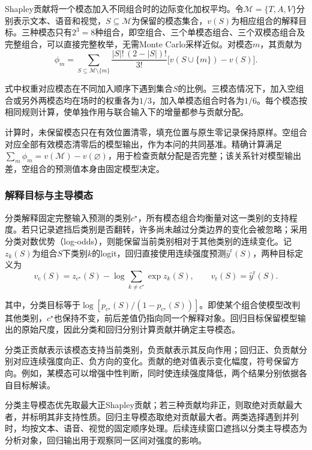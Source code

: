 \documentclass[UTF8,a4paper,12pt]{ctexart}
\newcommand{\QThreeParagraph}{\par\noindent\hspace*{2em}}
\begin{document}
Shapley贡献将一个模态加入不同组合时的边际变化加权平均。令$\mathcal M=\{T,A,V\}$分别表示文本、语音和视觉，$S\subseteq\mathcal M$为保留的模态集合，$v(S)$为相应组合的解释目标。三种模态只有$2^3=8$种组合，即空组合、三个单模态组合、三个双模态组合及完整组合，可以直接完整枚举，无需Monte Carlo采样近似。对模态$m$，其贡献为
\begin{equation}
\phi_m
=\sum_{S\subseteq\mathcal M\setminus\{m\}}
\frac{|S|!\,(2-|S|)!}{3!}
\bigl[v(S\cup\{m\})-v(S)\bigr].
\label{eq:q3_shapley}
\end{equation}
\QThreeParagraph 式中权重对应模态在不同加入顺序下遇到集合$S$的比例。三模态情况下，加入空组合或另外两模态均在场时的权重各为$1/3$，加入单模态组合时各为$1/6$。每个模态按相同规则计算，使单独作用与联合输入下的增量都参与贡献分配。

\QThreeParagraph 计算时，未保留模态只在有效位置清零，填充位置与原生零记录保持原样。空组合对应全部有效模态清零后的模型输出，作为本问的共同基准。精确计算满足$\sum_m\phi_m=v(\mathcal M)-v(\varnothing)$，用于检查贡献分配是否完整；该关系针对模型输出差，空组合的预测值本身由固定模型决定。

\subsubsection{解释目标与主导模态}
\QThreeParagraph 分类解释固定完整输入预测的类别$c^\star$，所有模态组合均衡量对这一类别的支持程度。若只记录遮挡后类别是否翻转，许多尚未越过分类边界的变化会被忽略；采用分类对数优势（log-odds），则能保留当前类别相对于其他类别的连续变化。记$z_k(S)$为组合$S$下类别$k$的logit，回归直接使用连续强度预测$\widehat y^{\mathrm r}(S)$，两种目标定义为
\begin{equation}
v_{\mathrm c}(S)
=z_{c^\star}(S)-\log\!\sum_{k\ne c^\star}\exp z_k(S),
\qquad
v_{\mathrm r}(S)=\widehat y^{\mathrm r}(S).
\label{eq:q3_value}
\end{equation}
\QThreeParagraph 其中，分类目标等于$\log[p_{c^\star}(S)/(1-p_{c^\star}(S))]$。即使某个组合使模型改判其他类别，$c^\star$也保持不变，前后差值仍指向同一个解释对象。回归目标保留模型输出的原始尺度，因此分类和回归分别计算贡献并确定主导模态。

\QThreeParagraph 分类正贡献表示该模态支持当前类别，负贡献表示其反向作用；回归正、负贡献分别对应连续强度向正、负方向的变化。贡献的绝对值表示变化幅度，符号保留方向。例如，某模态可以增强中性判断，同时使连续强度降低，两个结果分别依据各自目标解读。

\QThreeParagraph 分类主导模态优先取最大正Shapley贡献；若三种贡献均非正，则取绝对贡献最大者，并标明其非支持性质。回归主导模态取绝对贡献最大者。两类选择遇到并列时，均按文本、语音、视觉的固定顺序处理。后续连续窗口遮挡以分类主导模态为分析对象，回归输出用于观察同一区间对强度的影响。
\end{document}
